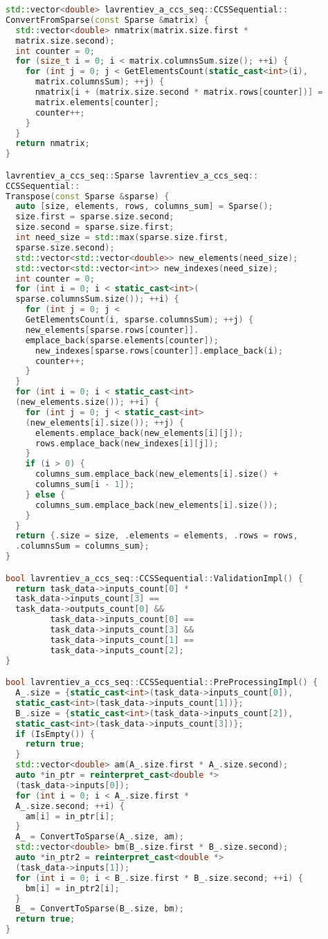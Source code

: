 \documentclass[12pt]{article}
\begin{document}
\begin{lstlisting}[language=C++]
std::vector<double> lavrentiev_a_ccs_seq::CCSSequential::
ConvertFromSparse(const Sparse &matrix) {
  std::vector<double> nmatrix(matrix.size.first * 
  matrix.size.second);
  int counter = 0;
  for (size_t i = 0; i < matrix.columnsSum.size(); ++i) {
    for (int j = 0; j < GetElementsCount(static_cast<int>(i), 
      matrix.columnsSum); ++j) {
      nmatrix[i + (matrix.size.second * matrix.rows[counter])] = 
      matrix.elements[counter];
      counter++;
    }
  }
  return nmatrix;
}

lavrentiev_a_ccs_seq::Sparse lavrentiev_a_ccs_seq::
CCSSequential::
Transpose(const Sparse &sparse) {
  auto [size, elements, rows, columns_sum] = Sparse();
  size.first = sparse.size.second;
  size.second = sparse.size.first;
  int need_size = std::max(sparse.size.first, 
  sparse.size.second);
  std::vector<std::vector<double>> new_elements(need_size);
  std::vector<std::vector<int>> new_indexes(need_size);
  int counter = 0;
  for (int i = 0; i < static_cast<int>(
  sparse.columnsSum.size()); ++i) {
    for (int j = 0; j < 
    GetElementsCount(i, sparse.columnsSum); ++j) {
    new_elements[sparse.rows[counter]].
    emplace_back(sparse.elements[counter]);
      new_indexes[sparse.rows[counter]].emplace_back(i);
      counter++;
    }
  }
  for (int i = 0; i < static_cast<int>
  (new_elements.size()); ++i) {
    for (int j = 0; j < static_cast<int>
    (new_elements[i].size()); ++j) {
      elements.emplace_back(new_elements[i][j]);
      rows.emplace_back(new_indexes[i][j]);
    }
    if (i > 0) {
      columns_sum.emplace_back(new_elements[i].size() + 
      columns_sum[i - 1]);
    } else {
      columns_sum.emplace_back(new_elements[i].size());
    }
  }
  return {.size = size, .elements = elements, .rows = rows, 
  .columnsSum = columns_sum};
}

bool lavrentiev_a_ccs_seq::CCSSequential::ValidationImpl() {
  return task_data->inputs_count[0] * 
  task_data->inputs_count[3] == 
  task_data->outputs_count[0] &&
         task_data->inputs_count[0] == 
         task_data->inputs_count[3] &&
         task_data->inputs_count[1] == 
         task_data->inputs_count[2];
}

bool lavrentiev_a_ccs_seq::CCSSequential::PreProcessingImpl() {
  A_.size = {static_cast<int>(task_data->inputs_count[0]), 
  static_cast<int>(task_data->inputs_count[1])};
  B_.size = {static_cast<int>(task_data->inputs_count[2]),
  static_cast<int>(task_data->inputs_count[3])};
  if (IsEmpty()) {
    return true;
  }
  std::vector<double> am(A_.size.first * A_.size.second);
  auto *in_ptr = reinterpret_cast<double *>
  (task_data->inputs[0]);
  for (int i = 0; i < A_.size.first * 
  A_.size.second; ++i) {
    am[i] = in_ptr[i];
  }
  A_ = ConvertToSparse(A_.size, am);
  std::vector<double> bm(B_.size.first * B_.size.second);
  auto *in_ptr2 = reinterpret_cast<double *>
  (task_data->inputs[1]);
  for (int i = 0; i < B_.size.first * B_.size.second; ++i) {
    bm[i] = in_ptr2[i];
  }
  B_ = ConvertToSparse(B_.size, bm);
  return true;
}


\end{lstlisting}
\end{document}
